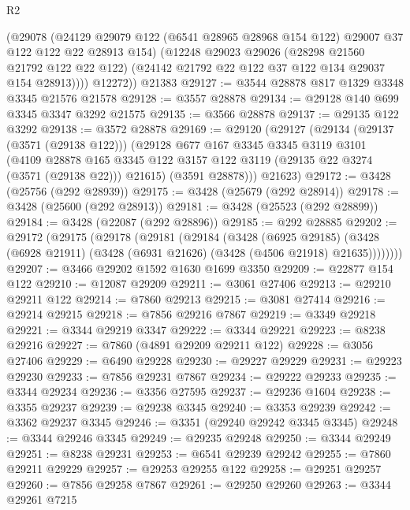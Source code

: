 \begin{lexlean}{R2}
\begin{coremodule}
          (@29078
            (@24129
              @29079
              @122
              (@6541 @28965 @28968 @154 @122)
              @29007
              @37
              @122
              @122
              @22
              @28913
              @154)
            (@12248
              @29023
              @29026
              (@28298 @21560 @21792 @122 @22 @122)
              (@24142 @21792 @22 @122 @37 @122 @134 @29037 @154 @28913))))
        @12272))
    @21383
@29127 := @3544 @28878 @817 @1329 @3348 @3345 @21576 @21578
@29128 := @3557 @28878
@29134 := @29128 @140 @699 @3345 @3347 @3292 @21575
@29135 := @3566 @28878
@29137 := @29135 @122 @3292
@29138 := @3572 @28878
@29169 := @29120
    (@29127
      (@29134
        (@29137 (@3571 (@29138 @122)))
        (@29128
          @677
          @167
          @3345
          @3345
          @3119
          @3101
          (@4109
            @28878
            @165
            @3345
            @122
            @3157
            @122
            @3119
            (@29135 @22 @3274 (@3571 (@29138 @22)))
            @21615)
          (@3591 @28878)))
      @21623)
@29172 := @3428 (@25756 (@292 @28939))
@29175 := @3428 (@25679 (@292 @28914))
@29178 := @3428 (@25600 (@292 @28913))
@29181 := @3428 (@25523 (@292 @28899))
@29184 := @3428 (@22087 (@292 @28896))
@29185 := @292 @28885
@29202 := @29172
    (@29175
      (@29178
        (@29181
          (@29184
            (@3428
              (@6925 @29185)
              (@3428 (@6928 @21911) (@3428 (@6931 @21626) (@3428 (@4506 @21918) @21635))))))))
@29207 := @3466 @29202 @1592 @1630 @1699 @3350
@29209 := @22877 @154 @122
@29210 := @12087 @29209
@29211 := @3061 @27406
@29213 := @29210 @29211 @122
@29214 := @7860 @29213
@29215 := @3081 @27414
@29216 := @29214 @29215
@29218 := @7856 @29216 @7867
@29219 := @3349 @29218
@29221 := @3344 @29219 @3347
@29222 := @3344 @29221
@29223 := @8238 @29216
@29227 := @7860 (@4891 @29209 @29211 @122)
@29228 := @3056 @27406
@29229 := @6490 @29228
@29230 := @29227 @29229
@29231 := @29223 @29230
@29233 := @7856 @29231 @7867
@29234 := @29222 @29233
@29235 := @3344 @29234
@29236 := @3356 @27595
@29237 := @29236 @1604
@29238 := @3355 @29237
@29239 := @29238 @3345
@29240 := @3353 @29239
@29242 := @3362 @29237 @3345
@29246 := @3351 (@29240 @29242 @3345 @3345)
@29248 := @3344 @29246 @3345
@29249 := @29235 @29248
@29250 := @3344 @29249
@29251 := @8238 @29231
@29253 := @6541 @29239 @29242
@29255 := @7860 @29211 @29229
@29257 := @29253 @29255 @122
@29258 := @29251 @29257
@29260 := @7856 @29258 @7867
@29261 := @29250 @29260
@29263 := @3344 @29261 @7215

\end{coremodule}
\end{lexlean}
